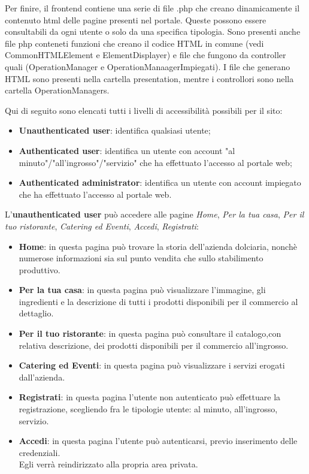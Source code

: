 Per finire, il frontend contiene una serie di file .php che creano dinamicamente il contenuto html delle pagine presenti nel portale.
Queste possono essere consultabili da ogni utente o solo da una specifica tipologia. Sono presenti anche file php conteneti funzioni che creano il codice HTML in comune (vedi CommonHTMLElement e ElementDisplayer) e file che fungono da controller quali (OperationManager e OperationManaagerImpiegati).
I file che generano HTML sono presenti nella cartella presentation, mentre i controllori sono nella cartella OperationManagers.

Qui di seguito sono elencati tutti i livelli di accessibilità possibili per il sito:
\begin{itemize}
	\item \textbf{Unauthenticated user}: identifica qualsiasi utente;
	\item \textbf{Authenticated user}: identifica un utente con account "al minuto"/"all'ingrosso"/"servizio" che ha effettuato l'accesso al portale web;
	\item \textbf{Authenticated administrator}: identifica un utente con account impiegato che ha effettuato l'accesso al portale web.
\end{itemize}

L'\textbf{unauthenticated user} può accedere alle pagine \textit{Home}, \textit{Per la tua casa}, \textit{Per il tuo ristorante}, \textit{Catering ed Eventi}, \textit{Accedi}, \textit{Registrati}:
\begin{itemize}
	\item \textbf{Home}: in questa pagina può trovare la storia dell'azienda dolciaria, nonchè numerose informazioni sia sul punto vendita che sullo stabilimento produttivo.

	\item \textbf{Per la tua casa}: in questa pagina può visualizzare l'immagine, gli ingredienti e la descrizione di tutti i prodotti disponibili per il commercio al dettaglio.

	\item \textbf{Per il tuo ristorante}: in questa pagina può consultare il catalogo,con relativa descrizione, dei prodotti disponibili per il commercio all'ingrosso.

	\item \textbf{Catering ed Eventi}: in questa pagina può visualizzare i servizi erogati dall'azienda.

	\item \textbf{Registrati}: in questa pagina l'utente non autenticato può effettuare la registrazione, scegliendo fra le tipologie utente: al minuto, all'ingrosso, servizio.

	\item \textbf{Accedi}: in questa pagina l'utente può autenticarsi, previo inserimento delle credenziali.\\
	Egli verrà reindirizzato alla propria area privata.
\end{itemize}

